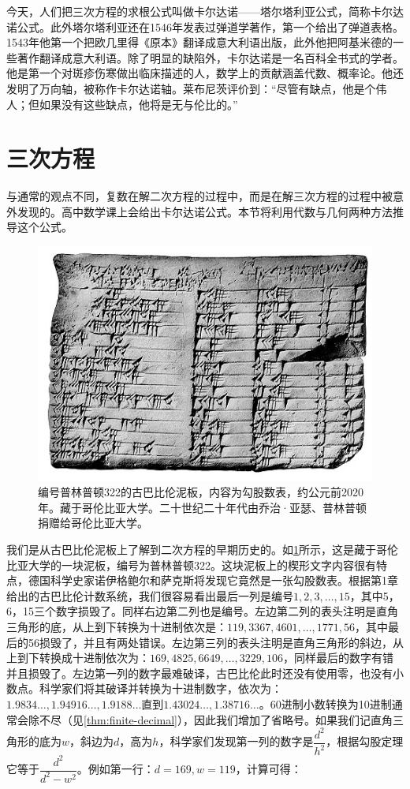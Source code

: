 \documentclass[b5paper]{ctexart}
\begin{document}
今天，人们把三次方程的求根公式叫做卡尔达诺——塔尔塔利亚公式，简称卡尔达诺公式。此外塔尔塔利亚还在1546年发表过弹道学著作，第一个给出了弹道表格。1543年他第一个把欧几里得《原本》翻译成意大利语出版，此外他把阿基米德的一些著作翻译成意大利语。除了明显的缺陷外，卡尔达诺是一名百科全书式的学者。他是第一个对斑疹伤寒做出临床描述的人，数学上的贡献涵盖代数、概率论。他还发明了万向轴，被称作卡尔达诺轴。莱布尼茨评价到：“尽管有缺点，他是个伟人；但如果没有这些缺点，他将是无与伦比的。”

\section{三次方程}

与通常的观点不同，复数在解二次方程的过程中，而是在解三次方程的过程中被意外发现的。高中数学课上会给出卡尔达诺公式。本节将利用代数与几何两种方法推导这个公式。

\begin{figure}[htbp]
  \centering
  \includegraphics[scale=0.33]{img/plimpton322}
  \caption{编号普林普顿322的古巴比伦泥板，内容为勾股数表，约公元前2020年。藏于哥伦比亚大学。二十世纪二十年代由乔治·亚瑟、普林普顿捐赠给哥伦比亚大学。}
 \label{fig:plimpton322}
\end{figure}

我们是从古巴比伦泥板上了解到二次方程的早期历史的。如\cref{fig:plimpton322}所示，这是藏于哥伦比亚大学的一块泥板，编号为普林普顿322。这块泥板上的楔形文字内容很有特点，德国科学史家诺伊格鲍尔和萨克斯将发现它竟然是一张勾股数表。根据第1章给出的古巴比伦计数系统，我们很容易看出最后一列是编号$1, 2, 3, \dotsc, 15$，其中5，6，15三个数字损毁了。同样右边第二列也是编号。左边第二列的表头注明是直角三角形的底，从上到下转换为十进制依次是：$119, 3367, 4601, \dotsc, 1771, 56$，其中最后的56损毁了，并且有两处错误。左边第三列的表头注明是直角三角形的斜边，从上到下转换成十进制依次为：$169, 4825, 6649, \dotsc, 3229, 106$，同样最后的数字有错并且损毁了。左边第一列的数字最难破译，古巴比伦此时还没有使用零，也没有小数点。科学家们将其破译并转换为十进制数字，依次为：$1.9834\dotso, 1.94916\dotso, 1.9188\dotso$直到$1.43024\dotso, 1.38716\dotso$。60进制小数转换为10进制通常会除不尽（见\cref{thm:finite-decimal}），因此我们增加了省略号。如果我们记直角三角形的底为$w$，斜边为$d$，高为$h$，科学家们发现第一列的数字是$\dfrac{d^2}{h^2}$，根据勾股定理它等于$\dfrac{d^2}{d^2 - w^2}$。例如第一行：$d = 169, w = 119$，计算可得：
\end{document}
